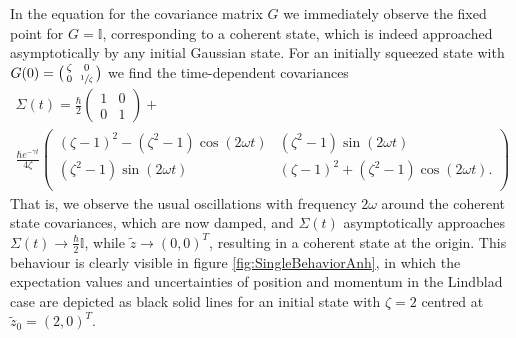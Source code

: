 \documentclass[12pt]{iopart} %
\begin{document}
In the equation for the covariance matrix $G$ we immediately observe the fixed point for $G=\mathbb{I}$, corresponding to a coherent state, which is indeed approached asymptotically by any initial Gaussian state. For an initially squeezed state with $G(0)=\big(\begin{smallmatrix}\zeta&&0\\0&&\sfrac{1}{\zeta}\end{smallmatrix} \big)$ we find the time-dependent covariances
\begin{multline}
    \Sigma(t)=\frac{\hbar}{2}
\begin{pmatrix}1&0\\0&1\end{pmatrix}+ \\
\frac{\hbar e^{-\gamma t}}{4 \zeta}\begin{pmatrix}
 (\zeta -1)^2-\left(\zeta ^2-1\right) \cos (2 \omega t  ) &
   \left(\zeta ^2-1\right)  \sin (2 \omega t ) \\
  \left(\zeta ^2-1\right) \sin (2\omega t  ) &  (\zeta
   -1)^2+\left(\zeta ^2-1\right) \cos (2 \omega t  ). \\
\end{pmatrix}
\end{multline}
That is, we observe the usual oscillations with frequency $2\omega$ around the coherent state covariances, which are now damped, and $\Sigma(t)$ asymptotically approaches $\Sigma(t)\to\frac{\hbar}{2}\mathbb{I}$, while $\tilde z\to (0,0)^T$, resulting in a coherent state at the origin. This behaviour is clearly visible in figure \ref{fig:SingleBehaviorAnh}, in which the expectation values and uncertainties of position and momentum in the Lindblad case are depicted as black solid lines for an initial state with $\zeta=2$ centred at $\tilde z_0=(2,0)^T$. 
\end{document}
